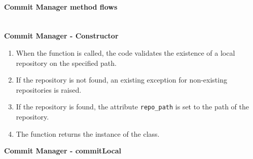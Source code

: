 \paragraph{Commit Manager method flows} \mbox{}\\

\textbf{Commit Manager - Constructor}
\begin{enumerate}
    \item When the function is called, the code validates the existence of a local repository on the specified path.
    \item If the repository is not found, an existing exception for non-existing repositories is raised.
    \item If the repository is found, the attribute \texttt{repo\_path} is set to the path of the repository.
    \item The function returns the instance of the class.
\end{enumerate}

\textbf{Commit Manager - commitLocal}

